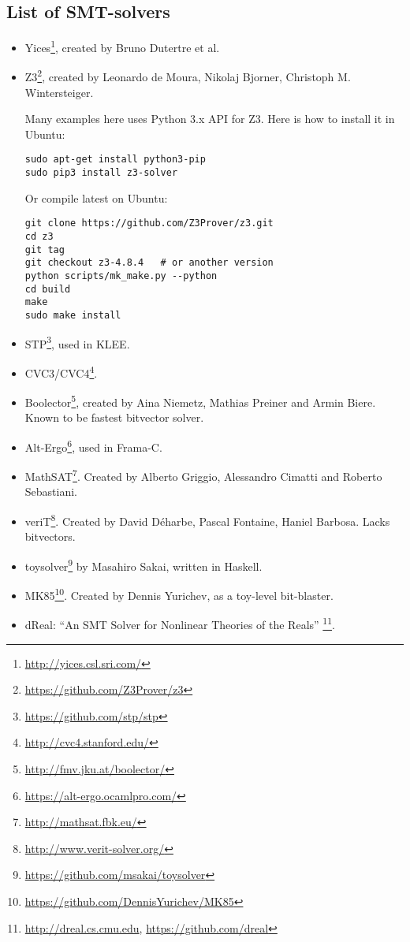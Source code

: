 \subsection{List of SMT-solvers}

\begin{itemize}

\item Yices\footnote{\url{http://yices.csl.sri.com/}}, created by Bruno Dutertre et al.

\item Z3\footnote{\url{https://github.com/Z3Prover/z3}},
created by Leonardo de Moura, Nikolaj Bjorner, Christoph M. Wintersteiger.

Many examples here uses Python 3.x API for Z3.
Here is how to install it in Ubuntu:

\begin{lstlisting}
sudo apt-get install python3-pip
sudo pip3 install z3-solver
\end{lstlisting}

Or compile latest on Ubuntu:

\begin{lstlisting}
git clone https://github.com/Z3Prover/z3.git
cd z3
git tag
git checkout z3-4.8.4	# or another version
python scripts/mk_make.py --python
cd build
make
sudo make install
\end{lstlisting}

\item STP\footnote{\url{https://github.com/stp/stp}}, used in KLEE.

\item CVC3/CVC4\footnote{\url{http://cvc4.stanford.edu/}}.

\item Boolector\footnote{\url{http://fmv.jku.at/boolector/}}, created by Aina Niemetz, Mathias Preiner and Armin Biere.
Known to be fastest bitvector solver.

\item Alt-Ergo\footnote{\url{https://alt-ergo.ocamlpro.com/}}, used in Frama-C.

\item MathSAT\footnote{\url{http://mathsat.fbk.eu/}}. Created by Alberto Griggio, Alessandro Cimatti and Roberto Sebastiani.

\item veriT\footnote{\url{http://www.verit-solver.org/}}.
Created by David Déharbe, Pascal Fontaine, Haniel Barbosa.
Lacks bitvectors.

\item toysolver\footnote{\url{https://github.com/msakai/toysolver}} by Masahiro Sakai, written in Haskell.

\item MK85\footnote{\url{https://github.com/DennisYurichev/MK85}}. Created by Dennis Yurichev, as a toy-level bit-blaster.

\item dReal: ``An SMT Solver for Nonlinear Theories of the Reals''
\footnote{\url{http://dreal.cs.cmu.edu}, \url{https://github.com/dreal}}.

\end{itemize}

